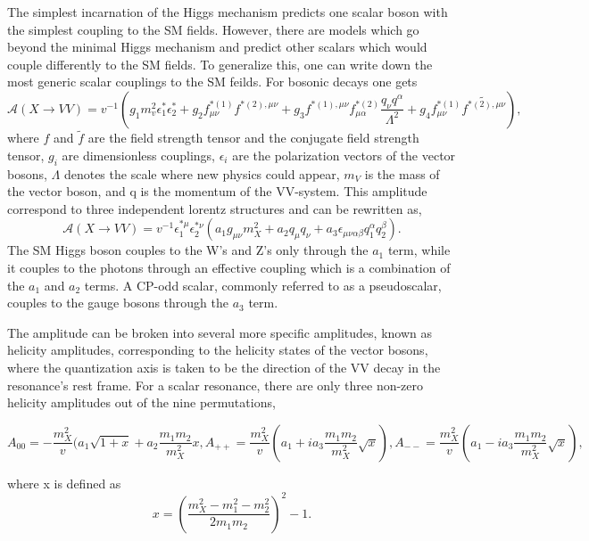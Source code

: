 The simplest incarnation of the Higgs mechanism predicts one scalar 
boson with the simplest coupling to the SM fields.  However, there are 
models which go beyond the minimal Higgs mechanism and predict other scalars
which would couple differently to the SM fields.  To generalize this, one 
can write down the most generic scalar couplings to the SM
feilds.  For bosonic decays one gets
\begin{equation}
  \mathscr{A}(X\to VV) = v^{-1}(g_1m_v^2\epsilon_1^*\epsilon_2^*+g_2f_{\mu\nu}^{*(1)}f^{*(2),\mu\nu}+g_3f^{*(1),\mu\nu}f_{\mu\alpha}^{*(2)}\frac{q_\nu q^\alpha}{\Lambda^2}+g_4f_{\mu\nu}^{*(1)}\tilde{f^{*(2),\mu\nu}}),
\label{eq:scalarAmp}
\end{equation}
where $f$ and $\tilde{f}$ are the field strength tensor and the conjugate field
strength tensor, $g_i$ are dimensionless couplings, $\epsilon_i$ are the 
polarization vectors of the vector bosons, $\Lambda$ denotes the scale where new
physics could appear, $m_V$ is the mass of the vector boson, and q is the
momentum of the VV-system.  
This amplitude correspond to three independent
lorentz structures and can be rewritten as,
\begin{equation}
\mathscr{A}(X\to VV) = v^{-1}\epsilon_1^{*\mu}\epsilon_2^{*\nu}(a_1g_{\mu\nu}m_X^2+a_2q_\mu q_\nu+a_3\epsilon_{\mu\nu\alpha\beta}q_1^{\alpha}q_2^{\beta}). 
\end{equation}
The SM Higgs boson couples to the W's and Z's only through the $a_1$ term,
while it couples to the photons through an effective coupling which is a 
combination of the $a_1$ and $a_2$ terms.  A CP-odd scalar, commonly referred 
to as a pseudoscalar, couples to the gauge bosons through the $a_3$ term.

The amplitude can be broken into several 
more specific amplitudes, known as helicity amplitudes, corresponding to the 
helicity states of the 
vector bosons, where the quantization axis is taken to be the direction
of the VV decay in the resonance's rest frame.  For a scalar
resonance, there are only three non-zero helicity amplitudes out of the 
nine permutations,
\begin{center}
\begin{subequations}
  \begin{equation}
    A_{00} = -\frac{m_X^2}{v}(a_1\sqrt{1+x}+a_2\frac{m_1m_2}{m_X^2}x,    \end{equation}
  \begin{equation}
    A_{++} = \frac{m_X^2}{v}(a_1+ia_3\frac{m_1m_2}{m_X^2}\sqrt{x}),
    \end{equation}
  \begin{equation}
    A_{--} = \frac{m_X^2}{v}(a_1-ia_3\frac{m_1m_2}{m_X^2}\sqrt{x}),
    \end{equation}
\end{subequations}
\end{center}
where x is defined as
\begin{equation}
x=(\frac{m_X^2-m_1^2-m_2^2}{2m_1m_2})^2-1.
\end{equation}

